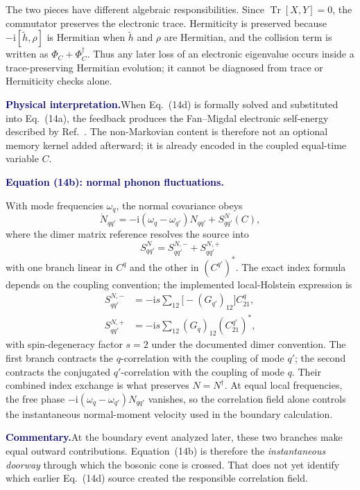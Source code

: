 \documentclass[10pt]{article}
\newcommand{\ii}{\mathrm i}
\newcommand{\Tr}{\operatorname{Tr}}
\newcommand{\pedbox}[2]{%
  \par\medskip
  \noindent\colorbox{pale}{%
    \parbox{\dimexpr\linewidth-2\fboxsep\relax}{%
      \textcolor{navy}{\textbf{#1}}\quad #2%
    }%
  }\par\medskip
}
\newcommand{\commentarybox}[1]{\pedbox{Commentary.}{#1}}
\newcommand{\physicalbox}[1]{\pedbox{Physical interpretation.}{#1}}
\newcommand{\flowlead}[1]{%
  \par\medskip
  \needspace{3\baselineskip}%
  \noindent\textcolor{navy}{\textbf{#1.}}\enspace\ignorespaces
}
\begin{document}
The two pieces have different algebraic responsibilities.  Since
\(\Tr[X,Y]=0\), the commutator preserves the electronic trace.  Hermiticity
is preserved because \(-\ii[\widetilde h,\rho]\) is Hermitian when
\(\widetilde h\) and \(\rho\) are Hermitian, and the collision term is written
as \(\Phi_C+\Phi_C^\dagger\).  Thus any later loss of an electronic
eigenvalue occurs inside a trace-preserving Hermitian evolution; it cannot be
diagnosed from trace or Hermiticity checks alone.

\physicalbox{When Eq.~(14d) is formally solved and substituted into
Eq.~(14a), the feedback produces the Fan--Migdal electronic self-energy
described by Ref.~\cite{riva2026}.  The non-Markovian content is therefore not
an optional memory kernel added afterward; it is already encoded in the
coupled equal-time variable \(C\).}

\flowlead{Equation (14b): normal phonon fluctuations}

With mode frequencies \(\omega_q\), the normal covariance obeys
\[
\dot N_{qq'}
=-\ii(\omega_q-\omega_{q'})N_{qq'}
+S^N_{qq'}(C),
\tag{14b$'$}
\]
where the dimer matrix reference resolves the source into
\[
S^N_{qq'}=S^{N,-}_{qq'}+S^{N,+}_{qq'}
\]
with one branch linear in \(C^q\) and the other in
\((C^{q'})^\ast\).  The exact index formula depends on the coupling convention;
the implemented local-Holstein expression is
\[
\begin{aligned}
S^{N,-}_{qq'}
&=-\ii s\sum_{12}
\bigl[-(G_{q'})_{12}\bigr]C^q_{21},\\
S^{N,+}_{qq'}
&=-\ii s\sum_{12}(G_q)_{12}(C^{q'}_{21})^\ast,
\end{aligned}
\tag{2.1}
\]
with spin-degeneracy factor \(s=2\) under the documented dimer convention.
The first branch contracts the \(q\)-correlation with the coupling of mode
\(q'\); the second contracts the conjugated \(q'\)-correlation with the
coupling of mode \(q\).  Their combined index exchange is what preserves
\(N=N^\dagger\).  At equal local frequencies, the free phase
\(-\ii(\omega_q-\omega_{q'})N_{qq'}\) vanishes, so the correlation field
alone controls the instantaneous normal-moment velocity used in the boundary
calculation.

\commentarybox{At the boundary event analyzed later, these two branches make
equal outward contributions.  Equation~(14b) is therefore the
\emph{instantaneous doorway} through which the bosonic cone is crossed.  That
does not yet identify which earlier Eq.~(14d) source created the responsible
correlation field.}
\end{document}
